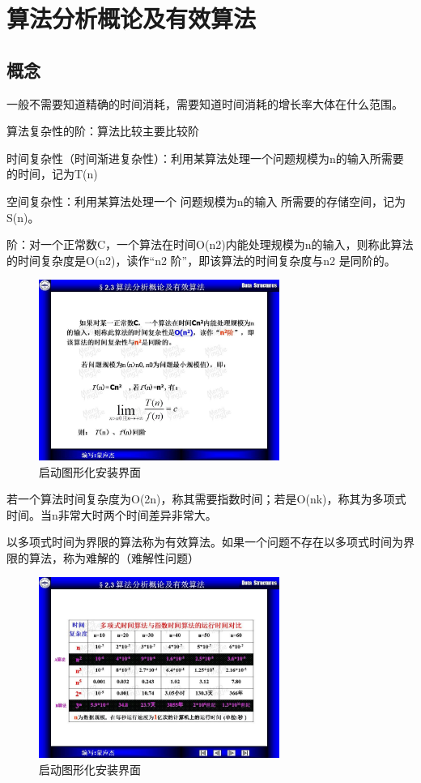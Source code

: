 \documentclass[AutoFakeBold]{LZUThesis2007}
\begin{document}
	\section{算法分析概论及有效算法}
		\subsection{概念}

			一般不需要知道精确的时间消耗，需要知道时间消耗的增长率大体在什么范围。

			算法复杂性的阶：算法比较主要比较阶

			时间复杂性（时间渐进复杂性）：利用某算法处理一个问题规模为n的输入所需要的时间，记为T(n)

			空间复杂性：利用某算法处理一个 问题规模为n的输入 所需要的存储空间，记为S(n)。

			阶：对一个正常数C，一个算法在时间Ο(n2)内能处理规模为n的输入，则称此算法的时间复杂度是Ο(n2)，读作“n2 阶”，即该算法的时间复杂度与n2 是同阶的。

			\begin{figure}[H]
			    \centering
			    \includegraphics[width=0.7\textwidth]{figures/2.1.jpg}
			    \caption{启动图形化安装界面}
			    \label{fig_install_texlive}
			\end{figure}

			若一个算法时间复杂度为O(2n)，称其需要指数时间；若是O(nk)，称其为多项式时间。当n非常大时两个时间差异非常大。

			以多项式时间为界限的算法称为有效算法。如果一个问题不存在以多项式时间为界限的算法，称为难解的（难解性问题）

			\begin{figure}[H]
			    \centering
			    \includegraphics[width=0.7\textwidth]{figures/2.2.jpg}
			    \caption{启动图形化安装界面}
			    \label{fig_install_texlive}
			\end{figure}
\end{document}

